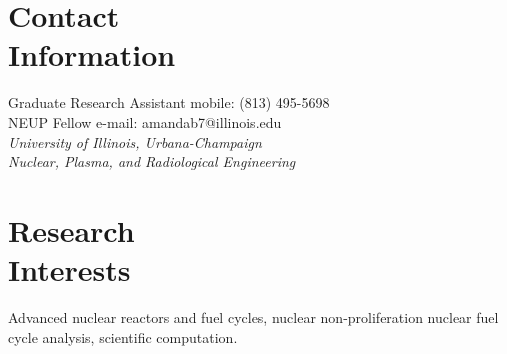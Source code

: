 \documentclass[margin,line]{resume}
\begin{document}
\begin{resume}



    \section{\mysidestyle Contact\\Information}
    Graduate Research Assistant \hfill mobile: (813) 495-5698 \vspace{0mm}\\\vspace{0mm}%
    NEUP Fellow \hfill e-mail: amandab7@illinois.edu            \vspace{0mm}\\\vspace{0mm}%
        \textsl{University of Illinois, Urbana-Champaign} \\
        \textsl{Nuclear, Plasma, and Radiological Engineering}
    \vspace{0mm}\\\vspace{-4.5mm}%

    \section{\mysidestyle Research\\Interests}
                Advanced nuclear reactors and fuel cycles, nuclear non-proliferation
                nuclear fuel cycle analysis,
                scientific computation.

\end{resume}
\end{document}
